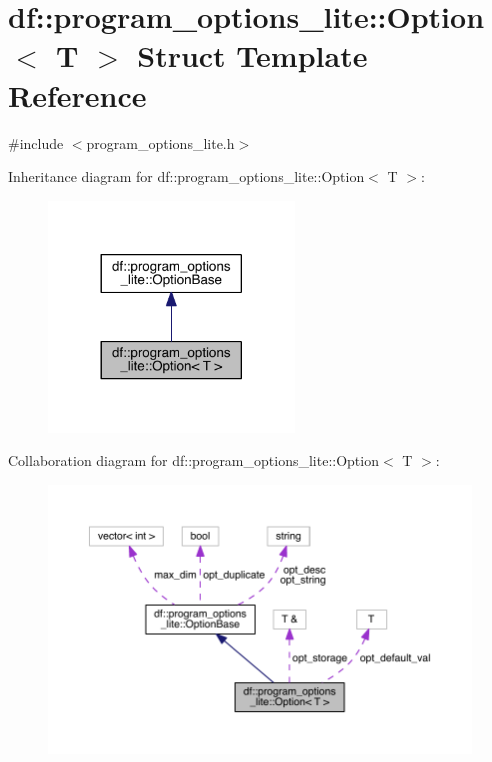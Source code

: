 \hypertarget{structdf_1_1program__options__lite_1_1_option}{}\section{df\+:\+:program\+\_\+options\+\_\+lite\+:\+:Option$<$ T $>$ Struct Template Reference}
\label{structdf_1_1program__options__lite_1_1_option}


{\ttfamily \#include $<$program\+\_\+options\+\_\+lite.\+h$>$}



Inheritance diagram for df\+:\+:program\+\_\+options\+\_\+lite\+:\+:Option$<$ T $>$\+:
\nopagebreak
\begin{figure}[H]
\begin{center}
\leavevmode
\includegraphics[width=185pt]{d6/d94/structdf_1_1program__options__lite_1_1_option__inherit__graph}
\end{center}
\end{figure}


Collaboration diagram for df\+:\+:program\+\_\+options\+\_\+lite\+:\+:Option$<$ T $>$\+:
\nopagebreak
\begin{figure}[H]
\begin{center}
\leavevmode
\includegraphics[width=350pt]{d2/dd2/structdf_1_1program__options__lite_1_1_option__coll__graph}
\end{center}
\end{figure}
